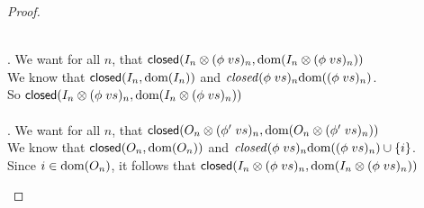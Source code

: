 \begin{proof}
\begin{enumerate}
\begin{tabbedproof}
  \\ . We want for all $n$, that $\mathsf{closed}({I_n \otimes (\phi\;vs)_n}, {\mbox{dom}({I_n \otimes (\phi\;vs)_n})})$\\
  \ooo We know that $\mathsf{closed}({I_n}, {\mbox{dom}({I_n})})$ and $\mathit{closed}{(\phi\;vs)_n}{\mbox{dom}({(\phi\;vs)_n})}$. \\
  \ooo So $\mathsf{closed}({I_n \otimes (\phi\;vs)_n}, {\mbox{dom}({I_n \otimes (\phi\;vs)_n})})$\\

  \\ . We want for all $n$, that $\mathsf{closed}({O_n \otimes (\phi'\;vs)_n}, {\mbox{dom}({O_n \otimes (\phi'\;vs)_n})})$\\
  \ooo We know that $\mathsf{closed}({O_n}, {\mbox{dom}({O_n})})$ and $\mathit{closed}{(\phi\;vs)_n}{\mbox{dom}({(\phi\;vs)_n}) \cup \{{i}\}}$. \\
  \ooo Since $i \in \mbox{dom}({O_n})$, it follows that $\mathsf{closed}({I_n \otimes (\phi\;vs)_n}, {\mbox{dom}({I_n \otimes (\phi\;vs)_n})})$\\


\end{tabbedproof}
\end{enumerate}
\end{proof}
